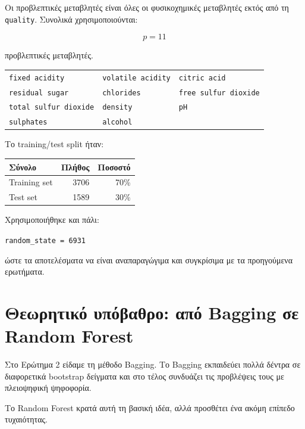 \documentclass[12pt,a4paper]{article}
\newcommand{\code}[1]{\texttt{\textenglish{#1}}}
\begin{document}
Οι προβλεπτικές μεταβλητές είναι όλες οι φυσικοχημικές μεταβλητές εκτός από τη
\code{quality}. Συνολικά χρησιμοποιούνται:

\[
    p = 11
\]

προβλεπτικές μεταβλητές.

\begin{center}
\footnotesize
\begin{tabular}{lll}
\toprule
\code{fixed acidity} & \code{volatile acidity} & \code{citric acid} \\
\code{residual sugar} & \code{chlorides} & \code{free sulfur dioxide} \\
\code{total sulfur dioxide} & \code{density} & \code{pH} \\
\code{sulphates} & \code{alcohol} & \\
\bottomrule
\end{tabular}
\end{center}

Το training/test split ήταν:

\begin{center}
\begin{tabular}{lrr}
\toprule
\textbf{Σύνολο} & \textbf{Πλήθος} & \textbf{Ποσοστό} \\
\midrule
Training set & 3706 & 70\% \\
Test set & 1589 & 30\% \\
\bottomrule
\end{tabular}
\end{center}

Χρησιμοποιήθηκε και πάλι:

\begin{center}
\code{random\_state = 6931}
\end{center}

ώστε τα αποτελέσματα να είναι αναπαραγώγιμα και συγκρίσιμα με τα προηγούμενα
ερωτήματα.

\section{Θεωρητικό υπόβαθρο: από Bagging σε Random Forest}

Στο Ερώτημα 2 είδαμε τη μέθοδο Bagging. Το Bagging εκπαιδεύει πολλά δέντρα σε
διαφορετικά bootstrap δείγματα και στο τέλος συνδυάζει τις προβλέψεις τους με
πλειοψηφική ψηφοφορία.

Το Random Forest κρατά αυτή τη βασική ιδέα, αλλά προσθέτει ένα ακόμη επίπεδο
τυχαιότητας.
\end{document}
